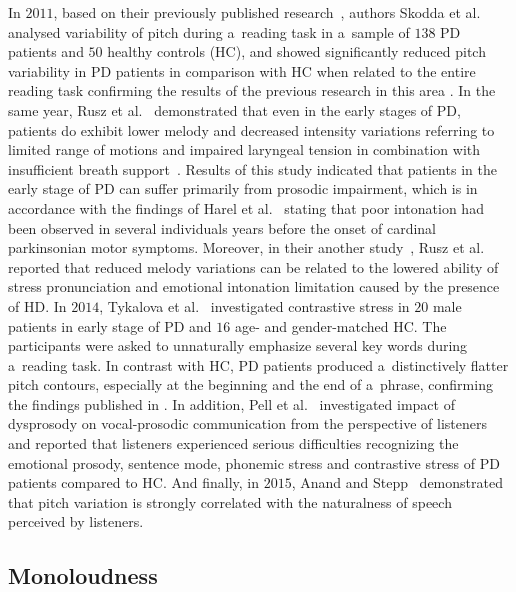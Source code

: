 In $2011$, based on their previously published research~\cite{Skodda2008}, authors Skodda et al.~\cite{Skodda2011b} analysed variability of pitch during a~reading task in a~sample of $138$ PD patients and $50$ healthy controls (HC), and showed significantly reduced pitch variability in PD patients in comparison with HC when related to the entire reading task confirming the results of the previous research in this area \cite{Metter1986, Flint1992, Goberman2005d}. In the same year, Rusz et al.~\cite{Rusz2011} demonstrated that even in the early stages of PD, patients do exhibit lower melody and decreased intensity variations referring to limited range of motions and impaired laryngeal tension in combination with insufficient breath support~\cite{Pinto2004}. Results of this study indicated that patients in the early stage of PD can suffer primarily from prosodic impairment, which is in accordance with the findings of Harel et al.~\cite{Harel2004b} stating that poor intonation had been observed in several individuals years before the onset of cardinal parkinsonian motor symptoms. Moreover, in their another study~\cite{Rusz2011}, Rusz et al. reported that reduced melody variations can be related to the lowered ability of stress pronunciation and emotional intonation limitation caused by the presence of HD. In $2014$, Tykalova et al.~\cite{Tykalova2014} investigated contrastive stress in $20$ male patients in early stage of PD and $16$ age- and gender-matched HC. The participants were asked to unnaturally emphasize several key words during a~reading task. In contrast with HC, PD patients produced a~distinctively flatter pitch contours, especially at the beginning and the end of a~phrase, confirming the findings published in \cite{Rusz2011, Rusz2011b}. In addition, Pell et al.~\cite{Pell2006} investigated impact of dysprosody on vocal-prosodic communication from the perspective of listeners and reported that listeners experienced serious difficulties recognizing the emotional prosody, sentence mode, phonemic stress and contrastive stress of PD patients compared to HC. And finally, in $2015$, Anand and Stepp~\cite{Anand2015} demonstrated that pitch variation is strongly correlated with the naturalness of speech perceived by listeners.

\subsection{Monoloudness}
\label{ch4_1_2}

